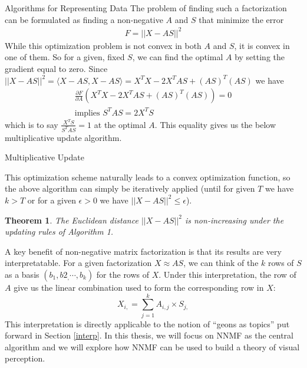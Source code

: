 \documentclass[12pt]{pom_thesis}
\newtheorem{theorem}{Theorem}
\begin{document}
\begin{chapter}{Algorithms for Representing Data}
The problem of finding such a factorization can be formulated as finding a non-negative $A$ and $S$ that minimize the error 
\begin{align}F = ||X-AS||^2
\end{align}
While this optimization problem is not convex in both $A$ and $S$, it is convex in one of them. So for a given, fixed $S$, we can find the optimal $A$ by setting the gradient equal to zero. Since $||X-AS||^2 = \langle X-AS, X-AS \rangle= X^TX - 2X^TAS + (AS)^T(AS)$ we have
\begin{align*}
\frac{\partial F }{\partial A} ( X^TX - 2X^TAS + (AS)^T(AS)) = 0\\
\text{implies }S^TAS = 2X^TS
\end{align*}
which is to say $\frac{X^TS}{S^TAS}=1$ at the optimal $A$. This equality gives us the below multiplicative update algorithm. 

\begin{algorithm}[H]
	\caption{Multiplicative Update}
\end{algorithm}

This optimization scheme naturally leads to a convex optimization function, so the above algorithm can simply be iteratively applied (until for given $T$ we have $k>T$ or for a given $\epsilon>0$ we have $||X-AS||^2 \leq \epsilon$).
\begin{theorem}
	The Euclidean distance $||X-AS||^2$ is non-increasing under the updating rules of Algorithm 1.
\end{theorem}

A key benefit of non-negative matrix factorization is that its results are very interpretatable. For a given factorization $X \approx AS$, we can think of the $k$ rows of $S$ as a basis $(b_1,b2_,\cdots,b_k)$ for the rows of $X$. Under this interpretation, the row of $A$ give us the linear combination used to form the corresponding row in $X:$
$$X_{i,} = \sum_{j= 1}^k A_{i,j} \times S_{j,}$$
This interpretation is directly applicable to the notion of ``geons as topics'' put forward in Section \ref{interp}. In this thesis, we will focus on NNMF as the central algorithm and we will explore how NNMF can be used to build a theory of visual perception.

\end{chapter}
\end{document}

